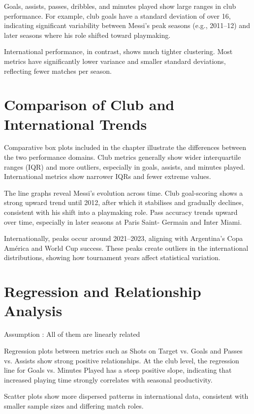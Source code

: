\documentclass[12pt,a4paper]{report}
\begin{document}
Goals, assists, passes, dribbles, and minutes played show large ranges in club performance. 
For example, club goals have a standard deviation of over 16, indicating significant variability 
between Messi’s peak seasons (e.g., 2011–12) and later seasons where his role shifted toward playmaking.

International performance, in contrast, shows much tighter clustering. Most metrics have significantly 
lower variance and smaller standard deviations, reflecting fewer matches per season.

\section{Comparison of Club and International Trends}

Comparative box plots included in the chapter illustrate the differences between the two performance 
domains. Club metrics generally show wider interquartile ranges (IQR) and more outliers, especially in 
goals, assists, and minutes played. International metrics show narrower IQRs and fewer extreme values.

The line graphs reveal Messi’s evolution across time. Club goal-scoring shows a strong upward trend 
until 2012, after which it stabilises and gradually declines, consistent with his shift into a 
playmaking role. Pass accuracy trends upward over time, especially in later seasons at Paris Saint-
Germain and Inter Miami.

Internationally, peaks occur around 2021–2023, aligning with Argentina’s Copa América and World Cup 
success. These peaks create outliers in the international distributions, showing how tournament years 
affect statistical variation.

\section{Regression and Relationship Analysis}

Assumption : All of them are linearly related

Regression plots between metrics such as Shots on Target vs. Goals and Passes vs. Assists show strong 
positive relationships. At the club level, the regression line for Goals vs. Minutes Played has a steep 
positive slope, indicating that increased playing time strongly correlates with seasonal productivity.

Scatter plots show more dispersed patterns in international data, consistent with smaller sample sizes 
and differing match roles.
\end{document}
